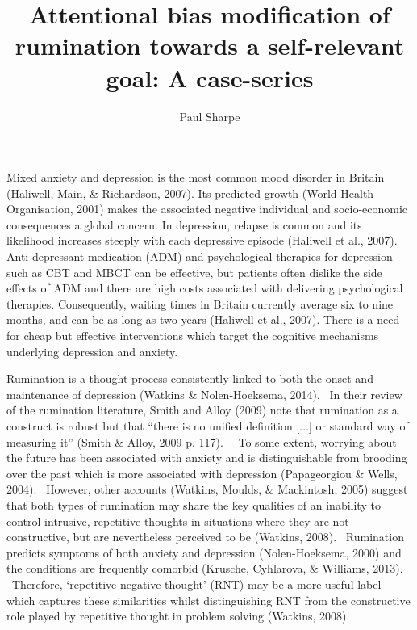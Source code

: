 \documentclass[man,a4paper]{apa6}
\title{Attentional bias modification of rumination towards a self-relevant goal: A case-series}
\author{Paul Sharpe}
\affiliation{University of Exeter}
\begin{document}
\maketitle
{}
\tableofcontents
\clearpage\setcounter{page}{1}


Mixed anxiety and depression is the most common mood disorder in Britain
(Haliwell, Main, \& Richardson, 2007).  Its predicted growth (World
Health Organisation, 2001) makes the associated negative individual and
socio-economic consequences a global concern.  In depression, relapse
is common and its likelihood increases steeply with each depressive
episode (Haliwell et al., 2007).  Anti-depressant medication (ADM)
and psychological therapies for depression such as CBT and MBCT can be
effective, but patients often dislike the side effects of ADM and there
are high costs associated with delivering psychological therapies.
Consequently, waiting times in Britain currently average six to
nine months, and can be as long as two years (Haliwell et al., 2007).
There is a need for cheap but effective interventions which target the
cognitive mechanisms underlying depression and anxiety.

Rumination is a thought process consistently linked to both the onset and maintenance of depression (Watkins \& Nolen-Hoeksema, 2014). \ In their review of the rumination literature, Smith and Alloy (2009) note that rumination as a construct is robust but that ``there is no unified definition [...] or standard way of measuring it'' (Smith \& Alloy, 2009 p. 117). \ \ To some extent, worrying about the future has been associated with anxiety and is distinguishable from brooding over the past which is more associated with depression (Papageorgiou \& Wells, 2004). \ However, other accounts (Watkins, Moulds, \& Mackintosh, 2005) suggest that both types of rumination may share the key qualities of an inability to control intrusive, repetitive thoughts in situations where they are not constructive, but are nevertheless perceived to be (Watkins, 2008). \ Rumination predicts symptoms of both anxiety and depression (Nolen-Hoeksema, 2000) and the conditions are frequently comorbid (Krusche, Cyhlarova, \& Williams, 2013). \ Therefore, `repetitive negative thought' (RNT) may be a more useful label which captures these similarities whilst distinguishing RNT from the constructive role played by repetitive thought in problem solving (Watkins, 2008).
\end{document}
